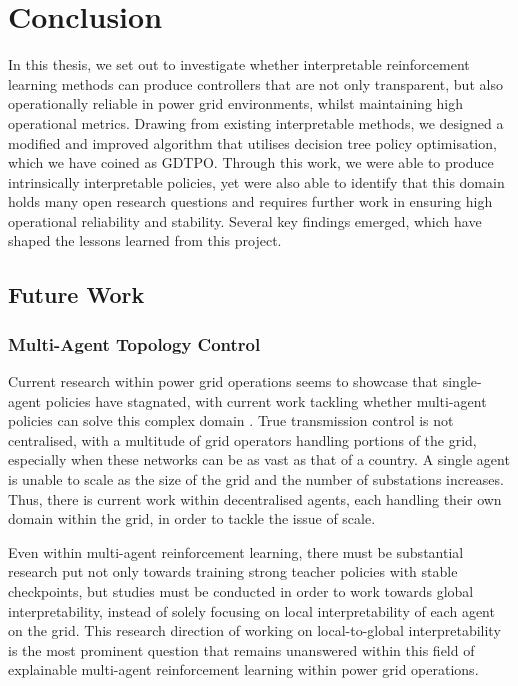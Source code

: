 \chapter{Conclusion}
\label{ch:Conclusion}


In this thesis, we set out to investigate whether interpretable reinforcement learning methods can produce controllers that are not only transparent, but also operationally reliable in power grid environments, whilst maintaining high operational metrics. Drawing from existing interpretable methods, we designed a modified and improved algorithm that utilises decision tree policy optimisation, which we have coined as GDTPO. Through this work, we were able to produce intrinsically interpretable policies, yet were also able to identify that this domain holds many open research questions and requires further work in ensuring high operational reliability and stability. Several key findings emerged, which have shaped the lessons learned from this project.

\section{Future Work}

\subsection{Multi-Agent Topology Control}

Current research within power grid operations seems to showcase that single-agent policies have stagnated, with current work tackling whether multi-agent policies can solve this complex domain \cite{marchesini2026marl2grid}. True transmission control is not centralised, with a multitude of grid operators handling portions of the grid, especially when these networks can be as vast as that of a country. A single agent is unable to scale as the size of the grid and the number of substations increases. Thus, there is current work within decentralised agents, each handling their own domain within the grid, in order to tackle the issue of scale.

Even within multi-agent reinforcement learning, there must be substantial research put not only towards training strong teacher policies with stable checkpoints, but studies must be conducted in order to work towards global interpretability, instead of solely focusing on local interpretability of each agent on the grid. This research direction of working on local-to-global interpretability is the most prominent question that remains unanswered within this field of explainable multi-agent reinforcement learning within power grid operations.


